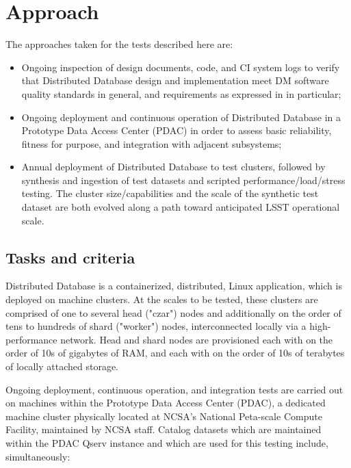 \documentclass[DM,STS,toc]{lsstdoc}
\def\product{Distributed Database}
\begin{document}
\newpage
\section{Approach}
\label{sec:approach}

The approaches taken for the tests described here are:

\begin{itemize}

  \item{Ongoing inspection of design documents, code, and CI system logs to verify that \product{} design
  and implementation meet DM software quality standards in general, and requirements as expressed in
   in particular;}

  \item{Ongoing deployment and continuous operation of \product{} in a Prototype Data Access Center
  (PDAC) in order to assess basic reliability, fitness for purpose, and integration with adjacent
  subsystems;}

  \item{Annual deployment of \product{} to test clusters, followed by synthesis and ingestion
  of test datasets and scripted performance/load/stress testing. The cluster size/capabilities and the
  scale of the synthetic test dataset are both evolved along a path toward anticipated LSST operational
  scale.}

\end{itemize}

\subsection{Tasks and criteria}
\label{sec:tasks}

\product{} is a containerized, distributed, Linux application, which is deployed on machine clusters.
At the scales to be tested, these clusters are comprised of one to several head ("czar") nodes and
additionally on the order of tens to hundreds of shard ("worker") nodes, interconnected locally via a
high-performance network. Head and shard nodes are provisioned each with on the order of 10s of gigabytes of
RAM, and each with on the order of 10s of terabytes of locally attached storage.

Ongoing deployment, continuous operation, and integration tests are carried out on machines within the
Prototype Data Access Center (PDAC), a dedicated machine cluster physically located at NCSA's National
Peta-scale Compute Facility, maintained by NCSA staff. Catalog datasets which are maintained within
the PDAC Qserv instance and which are used for this testing include, simultaneously:
\end{document}
